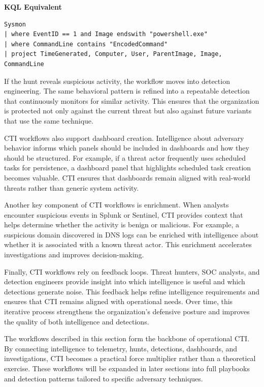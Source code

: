 \textbf{KQL Equivalent}
\begin{lstlisting}
Sysmon
| where EventID == 1 and Image endswith "powershell.exe"
| where CommandLine contains "EncodedCommand"
| project TimeGenerated, Computer, User, ParentImage, Image, CommandLine
\end{lstlisting}

If the hunt reveals suspicious activity, the workflow moves into detection engineering. The same behavioral pattern is refined into 
a repeatable detection that continuously monitors for similar activity. This ensures that the organization is protected not only 
against the current threat but also against future variants that use the same technique.

CTI workflows also support dashboard creation. Intelligence about adversary behavior informs which panels should be included in 
dashboards and how they should be structured. For example, if a threat actor frequently uses scheduled tasks for persistence, a 
dashboard panel that highlights scheduled task creation becomes valuable. CTI ensures that dashboards remain aligned with real-world 
threats rather than generic system activity.

Another key component of CTI workflows is enrichment. When analysts encounter suspicious events in Splunk or Sentinel, CTI provides 
context that helps determine whether the activity is benign or malicious. For example, a suspicious domain discovered in DNS logs 
can be enriched with intelligence about whether it is associated with a known threat actor. This enrichment accelerates investigations 
and improves decision-making.

Finally, CTI workflows rely on feedback loops. Threat hunters, SOC analysts, and detection engineers provide insight into which 
intelligence is useful and which detections generate noise. This feedback helps refine intelligence requirements and ensures that 
CTI remains aligned with operational needs. Over time, this iterative process strengthens the organization’s defensive posture and 
improves the quality of both intelligence and detections.

The workflows described in this section form the backbone of operational CTI. By connecting intelligence to telemetry, hunts, 
detections, dashboards, and investigations, CTI becomes a practical force multiplier rather than a theoretical exercise. 
These workflows will be expanded in later sections into full playbooks and detection patterns tailored to specific adversary techniques.
